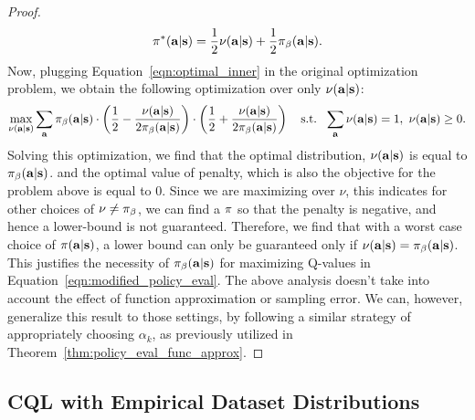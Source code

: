 \begin{proof}
\begin{equation}
    \pi^*(\mathbf{a}|\mathbf{s}) = \frac{1}{2} \nu(\mathbf{a}|\mathbf{s}) + \frac{1}{2} {\pi_\beta}(\mathbf{a}|\mathbf{s}).
    \label{eqn:optimal_inner}
\end{equation}
Now, plugging Equation~\ref{eqn:optimal_inner} in the original optimization problem, we obtain the following optimization over only $\nu(\mathbf{a}|\mathbf{s})$:
\begin{equation}
    \max_{\nu(\mathbf{a}|\mathbf{s})} \sum_{\mathbf{a}} {\pi_\beta}(\mathbf{a}|\mathbf{s}) \cdot \left( \frac{1}{2} - \frac{\nu(\mathbf{a}|\mathbf{s})}{2 {\pi_\beta}(\mathbf{a}|\mathbf{s})} \right) \cdot \left( \frac{1}{2} + \frac{\nu(\mathbf{a}|\mathbf{s})}{2 {\pi_\beta}(\mathbf{a}|\mathbf{s})} \right)~~~ \text{s.t.}~~ \sum_{\mathbf{a}} \nu(\mathbf{a}|\mathbf{s}) = 1,~ \nu(\mathbf{a}|\mathbf{s}) \geq 0.
\end{equation}
Solving this optimization, we find that the optimal distribution, $\nu(\mathbf{a}|\mathbf{s})$ is equal to ${\pi_\beta}(\mathbf{a}|\mathbf{s})$. and the optimal value of penalty, which is also the objective for the problem above is equal to $0$. Since we are maximizing over $\nu$, this indicates for other choices of $\nu \neq {\pi_\beta}$, we can find a $\pi$ so that the penalty is negative, and hence a lower-bound is not guaranteed. Therefore, we find that with a worst case choice of $\pi(\mathbf{a}|\mathbf{s})$, a lower bound can only be guaranteed only if $\nu(\mathbf{a}|\mathbf{s}) = {\pi_\beta}(\mathbf{a}|\mathbf{s})$. This justifies the necessity of ${\pi_\beta}(\mathbf{a}|\mathbf{s})$ for maximizing Q-values in Equation~\ref{eqn:modified_policy_eval}. The above analysis doesn't take into account the effect of function approximation or sampling error. We can, however, generalize this result to those settings, by following a similar strategy of appropriately choosing $\alpha_k$, as previously utilized in Theorem~\ref{thm:policy_eval_func_approx}.
\end{proof}



\subsection{CQL with Empirical Dataset Distributions}
\label{app:handling_unobserved_actions}

